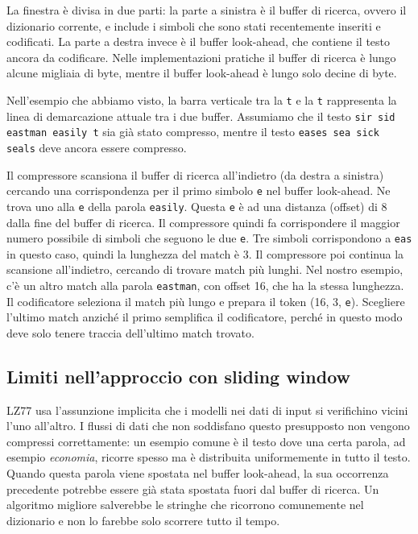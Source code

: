 La finestra è divisa in due parti: la parte a sinistra è il buffer di ricerca, ovvero il dizionario corrente, e include i simboli che sono stati recentemente inseriti e codificati. La parte a destra invece è il buffer look-ahead, che contiene il testo ancora da codificare.  Nelle implementazioni pratiche il buffer di ricerca è lungo alcune migliaia di byte, mentre il buffer look-ahead è lungo solo decine di byte.

Nell'esempio che abbiamo visto, la barra verticale tra la \texttt{t} e la \texttt{t} rappresenta la linea di demarcazione attuale tra i due buffer. Assumiamo che il testo \texttt{sir sid eastman easily t} sia già stato compresso, mentre il testo \texttt{eases sea sick seals} deve ancora essere compresso.

\vspace{5mm}

Il compressore scansiona il buffer di ricerca all'indietro (da destra a sinistra) cercando una corrispondenza per il primo simbolo \texttt{e} nel buffer look-ahead. 
Ne trova uno alla \texttt{e} della parola \texttt{easily}. 
Questa \texttt{e} è ad una distanza (offset) di 8 dalla fine del buffer di ricerca. 
Il compressore quindi fa corrispondere il maggior numero possibile di simboli che seguono le due \texttt{e}. Tre simboli corrispondono a \texttt{eas} in questo caso, quindi la lunghezza del match è 3. 
Il compressore poi continua la scansione all'indietro, cercando di trovare match più lunghi. Nel nostro esempio, c'è un altro match alla parola \texttt{eastman}, con offset 16, che ha la stessa lunghezza. 
Il codificatore seleziona il match più lungo e prepara il token (16, 3, \texttt{e}).
Scegliere l'ultimo match anziché il primo semplifica il codificatore, perché in questo modo deve solo tenere traccia dell'ultimo match trovato.

\subsection{Limiti nell'approccio con sliding window}
LZ77 usa l'assunzione implicita che i modelli nei dati di input
si verifichino vicini l'uno all'altro.
I flussi di dati che non soddisfano questo presupposto non vengono compressi correttamente: un esempio comune è il testo dove una certa parola, ad esempio \textit{economia}, ricorre spesso
ma è distribuita uniformemente in tutto il testo.
Quando questa parola viene spostata nel buffer look-ahead, la sua occorrenza precedente
potrebbe essere già stata spostata fuori dal buffer di ricerca.
Un algoritmo migliore salverebbe le stringhe che ricorrono comunemente nel dizionario
e non lo farebbe solo scorrere tutto il tempo.

